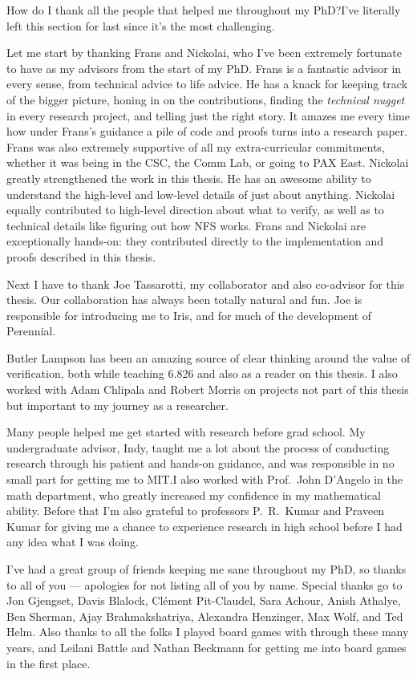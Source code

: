 How do I thank all the people that helped me throughout my PhD?\@ I've literally
left this section for last since it's the most challenging.

Let me start by thanking Frans and Nickolai, who I've been extremely fortunate
to have as my advisors from the start of my PhD. Frans is a fantastic advisor in
every sense, from technical advice to life advice. He has a knack for keeping
track of the bigger picture, honing in on the contributions, finding the
\emph{technical nugget} in every research project, and telling just the right
story. It amazes me every time how under Frans's guidance a pile of code and
proofs turns into a research paper. Frans was also extremely supportive of all
my extra-curricular commitments, whether it was being in the CSC, the Comm Lab,
or going to PAX East. Nickolai greatly strengthened the work in this thesis. He
has an awesome ability to understand the high-level and low-level details of
just about anything. Nickolai equally contributed to high-level direction about
what to verify, as well as to technical details like figuring out how NFS works.
Frans and Nickolai are exceptionally hands-on: they contributed directly to the
implementation and proofs described in this thesis.

Next I have to thank Joe Tassarotti, my collaborator and also co-advisor for
this thesis. Our collaboration has always been totally natural and fun. Joe is
responsible for introducing me to Iris, and for much of the development of
Perennial.

Butler Lampson has been an amazing source of clear thinking around the value of
verification, both while teaching 6.826 and also as a reader on this thesis. I
also worked with Adam Chlipala and Robert Morris on projects not part of this
thesis but important to my journey as a researcher.

Many people helped me get started with research before grad school. My
undergraduate advisor, Indy, taught me a lot about the process of conducting
research through his patient and hands-on guidance, and was responsible in no
small part for getting me to MIT.\@ I also worked with Prof.~John D'Angelo in
the math department, who greatly increased my confidence in my mathematical
ability. Before that I'm also grateful to professors P.~R.~Kumar and Praveen
Kumar for giving me a chance to experience research in high school before I had
any idea what I was doing.

I've had a great group of friends keeping me sane throughout my PhD, so thanks
to all of you --- apologies for not listing all of you by name. Special thanks
go to Jon Gjengset, Davis Blalock, Cl\'ement Pit-Claudel, Sara Achour, Anish Athalye, Ben Sherman,
Ajay Brahmakshatriya, Alexandra Henzinger, Max Wolf, and
Ted Helm. Also thanks to all the folks I played board
games with through these many years, and Leilani Battle and Nathan Beckmann for
getting me into board games in the first place.

